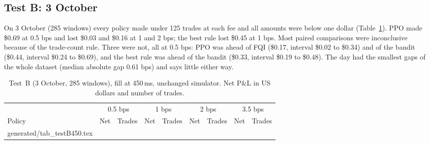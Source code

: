 \documentclass[12pt,a4paper]{article}
\makeatletter
\DeclareRobustCommand{\bps}{\ifmmode\,\text{bps}\else\,bps\fi}
\newcommand{\usd}[1]{\$#1}
\newcommand{\tabinput}[1]{\@@input #1 }
\makeatother
\begin{document}
\subsection{Test B: 3 October}
On 3 October (285 windows) every policy made under 125 trades at each fee and all amounts were
below one dollar (Table~\ref{tab:testB}). PPO made \usd{0.69} at 0.5\bps{} and lost \usd{0.03}
and \usd{0.16} at 1 and 2\bps; the best rule lost \usd{0.45} at 1\bps. Most paired comparisons
were inconclusive because of the trade-count rule. Three were not, all at 0.5\bps: PPO was
ahead of FQI (\usd{0.17}, interval \usd{0.02} to \usd{0.34}) and of the bandit (\usd{0.44},
interval \usd{0.24} to \usd{0.69}), and the best rule was ahead of the bandit (\usd{0.33},
interval \usd{0.19} to \usd{0.48}). The day had the smallest gaps of the whole dataset (median
absolute gap 0.61\bps) and says little either way.

\begin{table}[!htbp]
\centering
\caption{Test~B (3 October, 285 windows), fill at 450\,ms, unchanged simulator. Net P\&L in
US dollars and number of trades.}
\label{tab:testB}
\small
\setlength{\tabcolsep}{4.5pt}
\begin{tabular}{@{}lrrrrrrrr@{}}
\toprule
 & \multicolumn{2}{c}{0.5\bps} & \multicolumn{2}{c}{1\bps} & \multicolumn{2}{c}{2\bps} & \multicolumn{2}{c}{3.5\bps} \\
\cmidrule(lr){2-3}\cmidrule(lr){4-5}\cmidrule(lr){6-7}\cmidrule(l){8-9}
Policy & Net & Trades & Net & Trades & Net & Trades & Net & Trades \\
\midrule
\tabinput{generated/tab_testB450.tex}
\bottomrule
\end{tabular}
\end{table}
\end{document}
